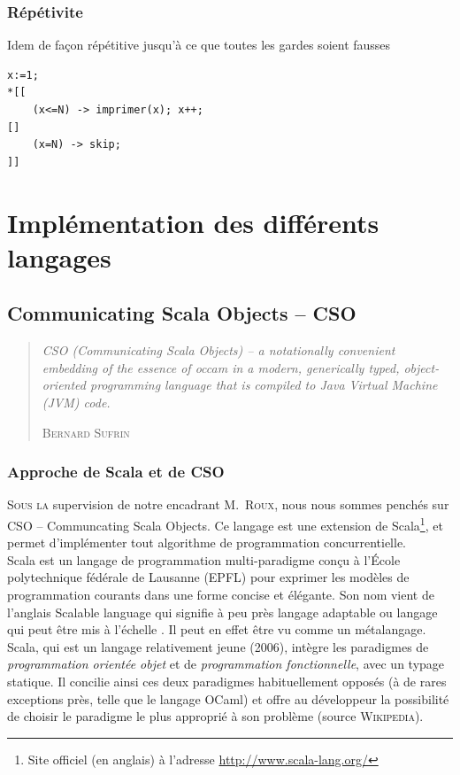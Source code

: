 \documentclass[a4paper,11pt,french]{report}
\begin{document}
 \section{Répétivite}
 Idem de façon répétitive jusqu’à ce que toutes les
gardes soient fausses

\begin{lstlisting}[frame=trBL]
x:=1;
*[[
	(x<=N) -> imprimer(x); x++;
[]
	(x=N) -> skip;
]]
\end{lstlisting}




\part{Implémentation des différents langages}
\chapter[CSO]{Communicating Scala Objects -- CSO}
\begin{quotation}
\textit{\og CSO (Communicating Scala Objects) – a notationally convenient embedding of the essence of occam in a modern, generically typed, object-oriented programming language that is compiled to Java Virtual Machine (JVM) code.\fg}
\begin{flushright}
\textsc{Bernard Sufrin}
\end{flushright}
\end{quotation}
\bigskip
\section{Approche de Scala et de CSO}

\lettrine{S}{ous la} supervision de notre encadrant M.\ \textsc{Roux}, nous nous sommes penchés sur CSO -- Communcating Scala Objects. Ce langage est une extension de Scala\footnote{Site officiel (en anglais) à l'adresse \url{http://www.scala-lang.org/}}, et permet d'implémenter tout algorithme de programmation concurrentielle.\\

Scala est un langage de programmation multi-paradigme conçu à l'École polytechnique fédérale de Lausanne (EPFL) pour exprimer les modèles de programmation courants dans une forme concise et élégante. Son nom vient de l'anglais Scalable language qui signifie à peu près \og langage adaptable \fg ou \og langage qui peut être mis à l'échelle \fg. Il peut en effet être vu comme un métalangage.
Scala, qui est un langage relativement jeune (2006), intègre les paradigmes de \emph{programmation orientée objet} et de \emph{programmation fonctionnelle}, avec un typage statique. Il concilie ainsi ces deux paradigmes habituellement opposés (à de rares exceptions près, telle que le langage OCaml) et offre au développeur la possibilité de choisir le paradigme le plus approprié à son problème (source \textsc{Wikipedia}).\\
\end{document}
